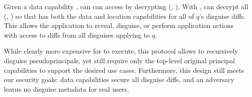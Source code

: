 Given a data capability , \sys can can access  by decrypting \enc(,
).
%
With , \sys can decrypt all \enc(, ) so that \sys has both the data and
location capabilities for all of $q$'s disguise diffs. This allows the application to reveal,
disguise, or perform application actions with access to diffs from all disguises applying to $q$.

While clearly more expensive for \sys to execute, this protocol allows \sys to recursively disguise
pseudoprincipals, yet still require only the top-level original principal capabilities to support the
desired use cases. Furthermore, this design still meets our security goals: data capabilities secure
all disguise diffs, and an adversary learns no disguise metadata for real users.

%
